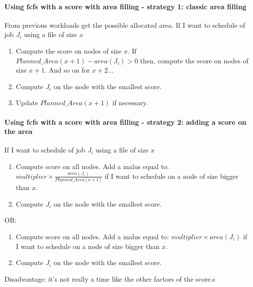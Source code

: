 \documentclass[a4paper]{article}
\begin{document}
\paragraph{Using fcfs with a score with area filling - strategy 1: classic area filling}
From previous workloads get the possible allocated area.
If I want to schedule of job $J_i$ using a file of size $x$
\begin{enumerate}
	\item Compute the score on nodes of size $x$. If $Planned\_Area(x+1) - area(J_i) > 0$ then, compute the score on nodes of size $x+1$. And so on for $x+2$...
	\item Compute $J_i$ on the node with the smallest score.
	\item Update $Planned\_Area(x+1)$ if necessary.
\end{enumerate}

\paragraph{Using fcfs with a score with area filling - strategy 2: adding a score on the area}
If I want to schedule of job $J_i$ using a file of size $x$
\begin{enumerate}
	\item Compute score on all nodes. Add a malus equal to: $multiplier \times \frac{area(J_i)}{Planned\_Area[x+1]}$ if I want to schedule on a node of size bigger than $x$.
	\item Compute $J_i$ on the node with the smallest score.
\end{enumerate}
OR:
\begin{enumerate}
	\item Compute score on all nodes. Add a malus equal to: $multiplier \times area(J_i)$ if I want to schedule on a node of size bigger than $x$.
	\item Compute $J_i$ on the node with the smallest score.
\end{enumerate}
Disadvantage: it's not really a time like the other factors of the score.s
\end{document}

